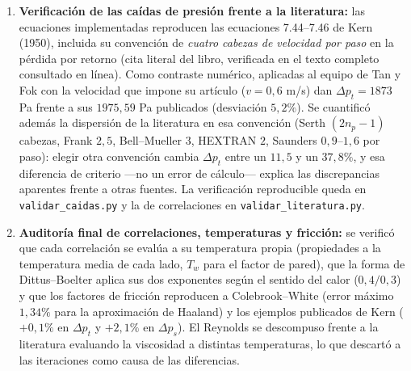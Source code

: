 \documentclass[11pt,a4paper]{article}
\begin{document}
\begin{enumerate}
\textbf{Hausen (1959)} para tubos en laminar, la de \textbf{Gnielinski
(1976)} para la transición ($2300 \le Re < 5\cdot 10^6$, con factor de
fricción de Petukhov) y la rama laminar de Kern con dependencia de Graetz
($D_e/B$) para la coraza. La continuidad de $Nu(Re)$ en los bordes de cada
banda se verificó numéricamente y un barrido de 504 combinaciones de
fluidos y caudales laminares no produjo ninguna excepción. Con estas
correlaciones el número de tubos del dimensionamiento baja en los casos de
transición ---el caso base pasa de $502$ a $470$ tubos--- y las desviaciones
frente al benchmark documentado del proyecto caen del $4$--$9\%$ al
$0{,}5$--$3{,}4\%$.
\item \textbf{Verificación de las caídas de presión frente a la literatura:}
las ecuaciones implementadas reproducen las ecuaciones 7.44--7.46 de Kern
(1950), incluida su convención de \emph{cuatro cabezas de velocidad por paso}
en la pérdida por retorno (cita literal del libro, verificada en el texto
completo consultado en línea). Como contraste numérico, aplicadas al equipo
de Tan y Fok con la velocidad que impone su artículo ($v = 0{,}6$ m/s) dan
$\Delta p_t = 1873$ Pa frente a sus $1975{,}59$ Pa publicados (desviación
$5{,}2\%$). Se cuantificó además la dispersión de la literatura en esa
convención (Serth $(2n_p-1)$ cabezas, Frank $2{,}5$, Bell--Mueller $3$,
HEXTRAN $2$, Saunders $0{,}9$--$1{,}6$ por paso): elegir otra convención
cambia $\Delta p_t$ entre un $11{,}5$ y un $37{,}8\%$, y esa diferencia de
criterio ---no un error de cálculo--- explica las discrepancias aparentes
frente a otras fuentes. La verificación reproducible queda en
\texttt{validar\_caidas.py} y la de correlaciones en
\texttt{validar\_literatura.py}.

\item \textbf{Auditoría final de correlaciones, temperaturas y fricción:}
se verificó que cada correlación se evalúa a su temperatura propia
(propiedades a la temperatura media de cada lado, $T_w$ para el factor de
pared), que la forma de Dittus--Boelter aplica sus dos exponentes según el
sentido del calor ($0{,}4/0{,}3$) y que los factores de fricción reproducen
a Colebrook--White (error máximo $1{,}34\%$ para la aproximación de Haaland)
y los ejemplos publicados de Kern ($+0{,}1\%$ en $\Delta p_t$ y $+2{,}1\%$
en $\Delta p_s$). El Reynolds se descompuso frente a la literatura
evaluando la viscosidad a distintas temperaturas, lo que descartó a las
iteraciones como causa de las diferencias.
\end{enumerate}
\end{document}
